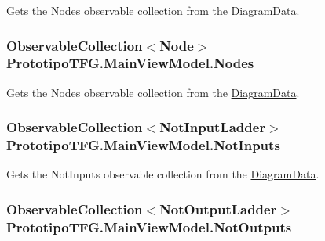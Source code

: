 Gets the Nodes observable collection from the \hyperlink{class_prototipo_t_f_g_1_1_diagram_data}{Diagram\+Data}. 

\hypertarget{class_prototipo_t_f_g_1_1_main_view_model_a2acdc08147f50d7a8371190fa1960d0d}{}
\subsubsection[{Nodes}]{\setlength{\rightskip}{0pt plus 5cm}Observable\+Collection$<${\bf Node}$>$ Prototipo\+T\+F\+G.\+Main\+View\+Model.\+Nodes\hspace{0.3cm}{\ttfamily [get]}}\label{class_prototipo_t_f_g_1_1_main_view_model_a2acdc08147f50d7a8371190fa1960d0d}


Gets the Nodes observable collection from the \hyperlink{class_prototipo_t_f_g_1_1_diagram_data}{Diagram\+Data}. 

\hypertarget{class_prototipo_t_f_g_1_1_main_view_model_a460dfd479d770d5333148bb2c9f374da}{}
\subsubsection[{Not\+Inputs}]{\setlength{\rightskip}{0pt plus 5cm}Observable\+Collection$<${\bf Not\+Input\+Ladder}$>$ Prototipo\+T\+F\+G.\+Main\+View\+Model.\+Not\+Inputs\hspace{0.3cm}{\ttfamily [get]}}\label{class_prototipo_t_f_g_1_1_main_view_model_a460dfd479d770d5333148bb2c9f374da}


Gets the Not\+Inputs observable collection from the \hyperlink{class_prototipo_t_f_g_1_1_diagram_data}{Diagram\+Data}. 

\hypertarget{class_prototipo_t_f_g_1_1_main_view_model_a1812ed9ddb30210df70ef3d2a80dfe77}{}
\subsubsection[{Not\+Outputs}]{\setlength{\rightskip}{0pt plus 5cm}Observable\+Collection$<${\bf Not\+Output\+Ladder}$>$ Prototipo\+T\+F\+G.\+Main\+View\+Model.\+Not\+Outputs\hspace{0.3cm}{\ttfamily [get]}}\label{class_prototipo_t_f_g_1_1_main_view_model_a1812ed9ddb30210df70ef3d2a80dfe77}


